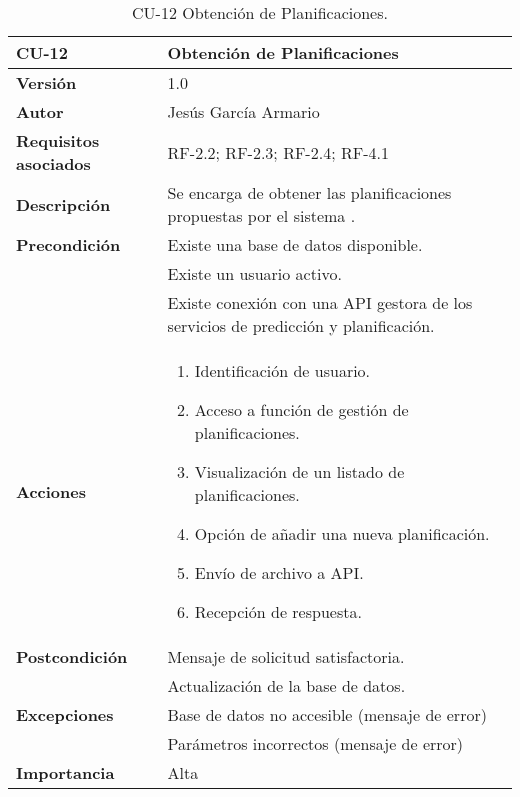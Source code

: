 \begin{table}[p]
	\centering
	\begin{tabularx}{\linewidth}{ p{} p{} }
		\toprule
		\textbf{CU-12}    & \textbf{Obtención de Planificaciones}\\
		\toprule
		\textbf{Versión}              & 1.0    \\
		\textbf{Autor}                & Jesús García Armario \\
		\textbf{Requisitos asociados} & RF-2.2; RF-2.3; RF-2.4; RF-4.1 \\
		\textbf{Descripción}          & Se encarga de obtener las planificaciones propuestas por el sistema . \\
		\textbf{Precondición}         & Existe una base de datos disponible. \\
  & Existe un usuario activo.\\
  & Existe conexión con una API gestora de los servicios de predicción y planificación.\\
		\textbf{Acciones}             &
		\begin{enumerate}
			\def\labelenumi{\arabic{enumi}.}
			\tightlist
			\item Identificación de usuario.
   \item Acceso a función de gestión de planificaciones.
   \item Visualización de un listado de planificaciones.
   \item Opción de añadir una nueva planificación.
   \item Envío de archivo a API.
   \item Recepción de respuesta.
\end{enumerate}\\
		\textbf{Postcondición}        &  Mensaje de solicitud satisfactoria.\\
  & Actualización de la base de datos.\\
		\textbf{Excepciones}          & Base de datos no accesible (mensaje de error)\\
  & Parámetros incorrectos (mensaje de error)\\
		\textbf{Importancia}          & Alta \\
		\bottomrule
	\end{tabularx}
	\caption{CU-12 Obtención de Planificaciones.}
 \end{table}

